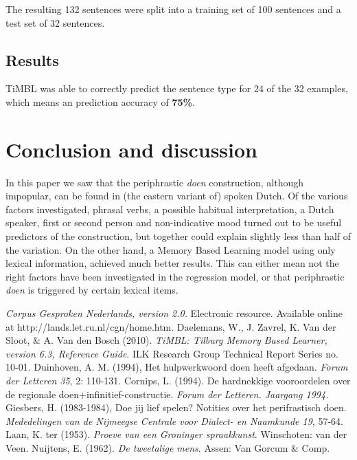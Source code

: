 \documentclass[12pt]{article}
\begin{document}
The resulting 132 sentences were split into a training set of 100 sentences and a test set of 32 sentences.

\subsection{Results}

TiMBL was able to correctly predict the sentence type for 24 of the 32 examples, which means an prediction accuracy of \textbf{75\%}.








\section{Conclusion and discussion} \label{conc}
In this paper we saw that the periphrastic \emph{doen} construction, although impopular, can be found in (the eastern variant of) spoken Dutch. Of the various factors investigated, phrasal verbs, a possible habitual interpretation, a Dutch speaker, first or second person and non-indicative mood turned out to be useful predictors of the construction, but together could explain slightly less than half of the variation. On the other hand, a Memory Based Learning model using only lexical information, achieved much better results. This can either mean not the right factors have been investigated in the regression model, or that periphrastic \emph{doen} is triggered by certain lexical items.

\begin{thebibliography}{99}\footnotesize
{}
\emph{Corpus Gesproken Nederlands, version 2.0.} Electronic resource. Available online at http://lands.let.ru.nl/cgn/home.htm.
Daelemans, W., J. Zavrel, K. Van der Sloot, \& A. Van den Bosch (2010). \emph{TiMBL: Tilburg Memory Based Learner, version 6.3, Reference Guide}. ILK Research Group Technical Report Series no. 10-01.
Duinhoven, A. M. (1994), Het hulpwerkwoord doen heeft afgedaan. \emph{Forum der Letteren 35}, 2: 110-131.
Cornips, L. (1994). De hardnekkige vooroordelen over de regionale doen+infinitief-constructie. \emph{Forum der Letteren. Jaargang 1994.}
Giesbers, H. (1983-1984), Doe jij lief spelen? Notities over het perifrastisch doen. \emph{Mededelingen van de Nijmeegse Centrale voor Dialect- en Naamkunde 19}, 57-64.
Laan, K. ter (1953). \emph{Proeve van een Groninger spraakkunst}. Winschoten: van der Veen.
Nuijtens, E. (1962). \emph{De tweetalige mens}. Assen: Van Gorcum \& Comp.
\end{thebibliography}
\end{document}
